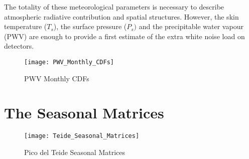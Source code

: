 The totality of these meteorological parameters is necessary to describe
atmospheric radiative contribution and spatial structures. However, the
skin temperature ($T_s$), the surface pressure ($P_s)$ and the precipitable
water vapour (PWV) are enough to provide a first estimate of the extra
white noise load on detectors.

\begin{figure}
        \centering
        \texttt{[image: PWV\_Monthly\_CDFs]}
        \caption{PWV Monthly CDFs}
        \label{fig:pwv_monthly_cdfs}
\end{figure}

\section{The Seasonal Matrices}

\begin{figure}
        \centering
        \texttt{[image: Teide\_Seasonal\_Matrices]}
        \caption{Pico del Teide Seasonal Matrices}
        \label{fig:teide_seasonal_matrices}
\end{figure}

